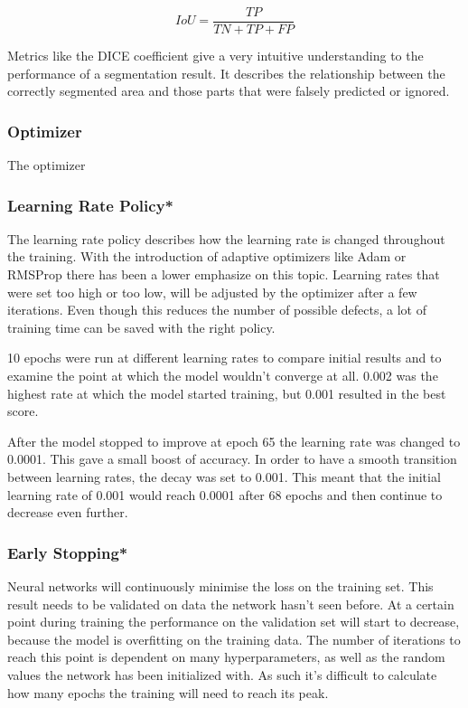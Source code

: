 \begin{equation}
IoU = \frac{TP}{TN+TP+FP}
\end{equation}

Metrics like the DICE coefficient give a very intuitive understanding to the performance of a segmentation result. It describes the relationship between the correctly segmented area and those parts that were falsely predicted or ignored.
\fi

\subsubsection{Optimizer}

The optimizer 

\subsubsection{Learning Rate Policy*}

The learning rate policy describes how the learning rate is changed throughout the training. With the introduction of adaptive optimizers like Adam or RMSProp there has been a lower emphasize on this topic. Learning rates that were set too high or too low, will be adjusted by the optimizer after a few iterations. Even though this reduces the number of possible defects, a lot of training time can be saved with the right policy.

10 epochs were run at different learning rates to compare initial results and to examine the point at which the model wouldn't converge at all. 0.002 was the highest rate at which the model started training, but 0.001 resulted in the best score.

After the model stopped to improve at epoch 65 the learning rate was changed to 0.0001. This gave a small boost of accuracy. In order to have a smooth transition between learning rates, the decay was set to 0.001. This meant that the initial learning rate of 0.001 would reach 0.0001 after 68 epochs and then continue to decrease even further.

\subsubsection{Early Stopping*}

Neural networks will continuously minimise the loss on the training set. This result needs to be validated on data the network hasn't seen before. At a certain point during training the performance on the validation set will start to decrease, because the model is overfitting on the training data. The number of iterations to reach this point is dependent on many hyperparameters, as well as the random values the network has been initialized with. As such it's difficult to calculate how many epochs the training will need to reach its peak.

